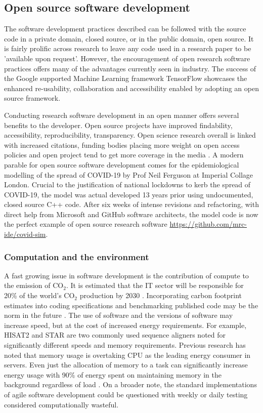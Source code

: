 \documentclass[../main.tex]{subfiles}
\begin{document}
\subsection{Open source software development}

The software development practices described can be followed with the source code in a private domain, closed source, or in the public domain, open source. 
It is fairly prolific across research to leave any code used in a research paper to be 'available upon request'.
However, the encouragement of open research software practices offers many of the advantages currently seen in industry. 
The success of the Google supported Machine Learning framework TensorFlow showcases the enhanced re-usability, collaboration and accessibility enabled by adopting an open source framework. 

Conducting research software development in an open manner offers several benefits to the developer.
Open source projects have improved findability, accessibility, reproducibility, transparency.
Open science research overall is linked with increased citations, funding bodies placing more weight on open access policies and open project tend to get more coverage in the media \parencite{McKiernan2016}.
A modern parable for open source software development comes for the epidemiological modelling of the spread of COVID-19 by Prof Neil Ferguson at Imperial Collage London.
Crucial to the justification of national lockdowns to kerb the spread of COVID-19, the model was actual developed 13 years prior using undocumented, closed source C++ code.
After six weeks of intense revisions and refactoring, with direct help from Microsoft and GitHub software architects, the model code is now the perfect example of open source research software \url{https://github.com/mrc-ide/covid-sim}.

\subsubsection{Computation and the environment}

A fast growing issue in software development is the contribution of compute to the emission of CO$_2$.
It is estimated that the IT sector will be responsible for 20\% of the world's CO$_2$ production by 2030 \parencite{CCEE2020}. 
Incorporating carbon footprint estimates into coding specifications and benchmarking published code may be the norm in the future \parencite{Lannelongue2021}.
The use of software and the versions of software may increase speed, but at the cost of increased energy requirements.
For example, HISAT2 and STAR are two commonly used sequence aligners noted for significantly different speeds and memory requirements.
Previous research has noted that memory usage is overtaking CPU as the leading energy consumer in servers.
Even just the allocation of memory to a task can significantly increase energy usage with 90\% of energy spent on maintaining memory in the background regardless of load \parencite{Karyakin2017}.
On a broader note, the standard implementations of agile software development could be questioned with weekly or daily testing considered computationally wasteful.
\end{document}
